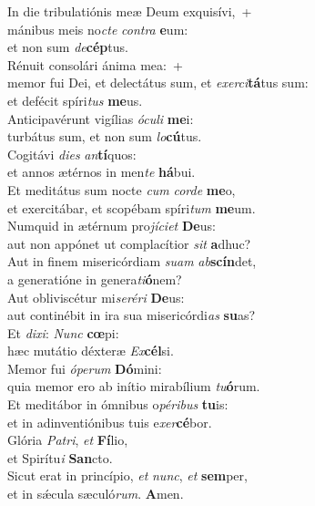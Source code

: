 \evenverse In die tribulatiónis meæ Deum exquisívi,~+\\\evenverse  mánibus meis no\textit{cte} \textit{con}\textit{tra} \textbf{e}um:~\*\\
\evenverse et non sum \textit{de}\textbf{cép}tus.\\
\oddverse Rénuit consolári ánima mea:~+\\
\oddverse  memor fui Dei, et delectátus sum, et \textit{e}\textit{xer}\textit{ci}\textbf{tá}tus sum:~\*\\
\oddverse et defécit spíri\textit{tus} \textbf{me}us.\\
\evenverse Anticipavérunt vigílias \textit{ó}\textit{cu}\textit{li} \textbf{me}i:~\*\\
\evenverse turbátus sum, et non sum \textit{lo}\textbf{cú}tus.\\
\oddverse Cogitávi \textit{di}\textit{es} \textit{an}\textbf{tí}quos:~\*\\
\oddverse et annos ætérnos in men\textit{te} \textbf{há}bui.\\
\evenverse Et meditátus sum nocte \textit{cum} \textit{cor}\textit{de} \textbf{me}o,~\*\\
\evenverse et exercitábar, et scopébam spíri\textit{tum} \textbf{me}um.\\
\oddverse Numquid in ætérnum pro\textit{jí}\textit{ci}\textit{et} \textbf{De}us:~\*\\
\oddverse aut non appónet ut complacítior \textit{sit} \textbf{a}dhuc?\\
\evenverse Aut in finem misericórdiam \textit{su}\textit{am} \textit{ab}\textbf{scín}det,~\*\\
\evenverse a generatióne in genera\textit{ti}\textbf{ó}nem?\\
\oddverse Aut obliviscétur mi\textit{se}\textit{ré}\textit{ri} \textbf{De}us:~\*\\
\oddverse aut continébit in ira sua misericórdi\textit{as} \textbf{su}as?\\
\evenverse Et \textit{di}\textit{xi}: \textit{Nunc} \textbf{cœ}pi:~\*\\
\evenverse hæc mutátio déxteræ \textit{Ex}\textbf{cél}si.\\
\oddverse Memor fui \textit{ó}\textit{pe}\textit{rum} \textbf{Dó}mini:~\*\\
\oddverse quia memor ero ab inítio mirabílium \textit{tu}\textbf{ó}rum.\\
\evenverse Et meditábor in ómnibus o\textit{pé}\textit{ri}\textit{bus} \textbf{tu}is:~\*\\
\evenverse et in adinventiónibus tuis e\textit{xer}\textbf{cé}bor.\\
\oddverse Glória \textit{Pa}\textit{tri}, \textit{et} \textbf{Fí}lio,~\*\\
\oddverse et Spirítu\textit{i} \textbf{San}cto.\\
\evenverse Sicut erat in princípio, \textit{et} \textit{nunc}, \textit{et} \textbf{sem}per,~\*\\
\evenverse et in sǽcula sæculó\textit{rum}. \textbf{A}men.\\
